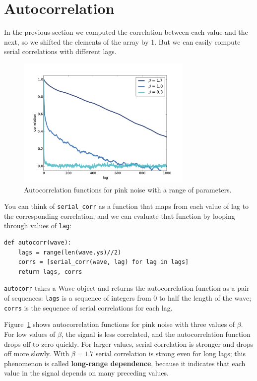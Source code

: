 \documentclass[12pt]{book}
\begin{document}
\section{Autocorrelation}
\label{autopink}

In the previous section we computed the correlation between each
value and the next, so we shifted the elements of the array by 1.
But we can easily compute serial correlations with
different lags.

\begin{figure}
\centerline{\includegraphics[height=2.5in]{figs/autocorr4.pdf}}
\caption{Autocorrelation functions for pink noise with a range
of parameters.}
\label{fig.autocorr4}
\end{figure}

You can think of \verb"serial_corr" as a function that
maps from each value of lag to the corresponding correlation, and we
can evaluate that function by looping through values of {\tt lag}:

\begin{verbatim}
def autocorr(wave):
    lags = range(len(wave.ys)//2)
    corrs = [serial_corr(wave, lag) for lag in lags]
    return lags, corrs
\end{verbatim}

{\tt autocorr} takes a Wave object and returns the autocorrelation
function as a pair of sequences: {\tt lags} is a sequence of
integers from 0 to half the length of the wave; {\tt corrs}
is the sequence of serial correlations for each lag.

Figure~\ref{fig.autocorr4} shows autocorrelation functions for pink
noise with three values of $\beta$.  For low values of $\beta$, the
signal is less correlated, and the autocorrelation function drops
off to zero quickly.  For larger values, serial correlation
is stronger and drops off more slowly.  With $\beta=1.7$ serial
correlation is strong even for long lags; this phenomenon is called
{\bf long-range dependence}, because it indicates that each value in
the signal depends on many preceding values.
\end{document}
